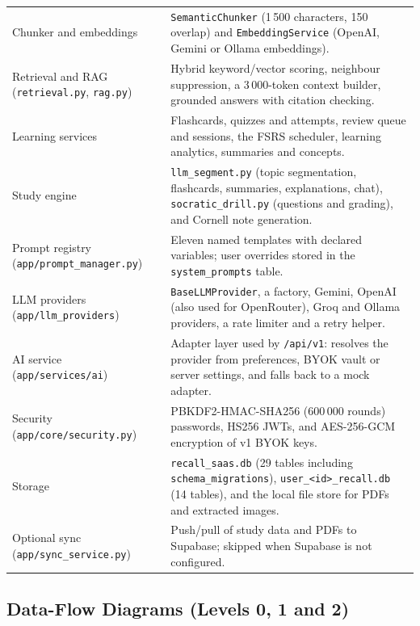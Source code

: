 {\begin{longtable}{@{}p{}p{}@{}}
Chunker and embeddings & \texttt{SemanticChunker} (1\,500 characters, 150 overlap) and \texttt{EmbeddingService} (OpenAI, Gemini or Ollama embeddings).\\
Retrieval and RAG (\texttt{retrieval.py}, \texttt{rag.py}) & Hybrid keyword/vector scoring, neighbour suppression, a 3\,000-token context builder, grounded answers with citation checking.\\
Learning services & Flashcards, quizzes and attempts, review queue and sessions, the FSRS scheduler, learning analytics, summaries and concepts.\\
Study engine & \texttt{llm\_segment.py} (topic segmentation, flashcards, summaries, explanations, chat), \texttt{socratic\_drill.py} (questions and grading), and Cornell note generation.\\
Prompt registry (\texttt{app/prompt\_manager.py}) & Eleven named templates with declared variables; user overrides stored in the \texttt{system\_prompts} table.\\
LLM providers (\texttt{app/llm\_providers}) & \texttt{BaseLLMProvider}, a factory, Gemini, OpenAI (also used for OpenRouter), Groq and Ollama providers, a rate limiter and a retry helper.\\
AI service (\texttt{app/services/ai}) & Adapter layer used by \texttt{/api/v1}: resolves the provider from preferences, BYOK vault or server settings, and falls back to a mock adapter.\\
Security (\texttt{app/core/security.py}) & PBKDF2-HMAC-SHA256 (600\,000 rounds) passwords, HS256 JWTs, and AES-256-GCM encryption of v1 BYOK keys.\\
Storage & \texttt{recall\_saas.db} (29 tables including \texttt{schema\_migrations}), \texttt{user\_<id>\_recall.db} (14 tables), and the local file store for PDFs and extracted images.\\
Optional sync (\texttt{app/sync\_service.py}) & Push/pull of study data and PDFs to Supabase; skipped when Supabase is not configured.\\
\end{longtable}
}

\subsection{Data-Flow Diagrams (Levels 0, 1 and 2)}\label{sec:dfd}

